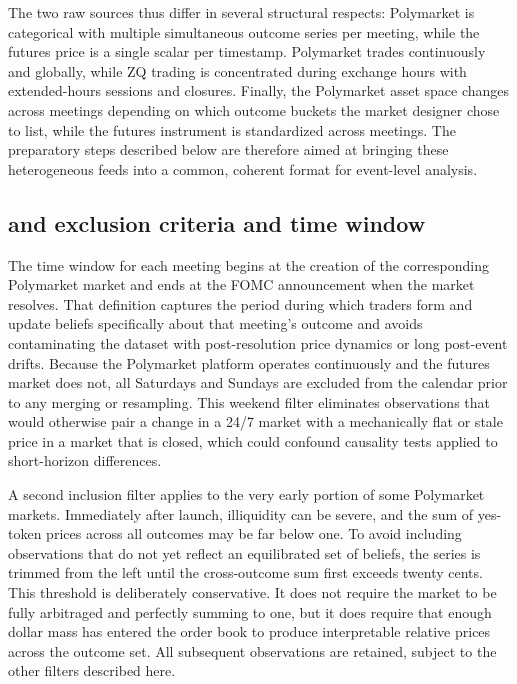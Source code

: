 The two raw sources thus differ in several structural respects: Polymarket is categorical with multiple simultaneous outcome series per meeting, while the futures price is a single scalar per timestamp. Polymarket trades continuously and globally, while ZQ trading is concentrated during exchange hours with extended-hours sessions and closures. Finally, the Polymarket asset space changes across meetings depending on which outcome buckets the market designer chose to list, while the futures instrument is standardized across meetings. The preparatory steps described below are therefore aimed at bringing these heterogeneous feeds into a common, coherent format for event-level analysis.

\subsection{and exclusion criteria and time window}

The time window for each meeting begins at the creation of the corresponding Polymarket market and ends at the FOMC announcement when the market resolves. That definition captures the period during which traders form and update beliefs specifically about that meeting’s outcome and avoids contaminating the dataset with post-resolution price dynamics or long post-event drifts. Because the Polymarket platform operates continuously and the futures market does not, all Saturdays and Sundays are excluded from the calendar prior to any merging or resampling. This weekend filter eliminates observations that would otherwise pair a change in a 24/7 market with a mechanically flat or stale price in a market that is closed, which could confound causality tests applied to short-horizon differences.

A second inclusion filter applies to the very early portion of some Polymarket markets. Immediately after launch, illiquidity can be severe, and the sum of yes-token prices across all outcomes may be far below one. To avoid including observations that do not yet reflect an equilibrated set of beliefs, the series is trimmed from the left until the cross-outcome sum first exceeds twenty cents. This threshold is deliberately conservative. It does not require the market to be fully arbitraged and perfectly summing to one, but it does require that enough dollar mass has entered the order book to produce interpretable relative prices across the outcome set. All subsequent observations are retained, subject to the other filters described here.

